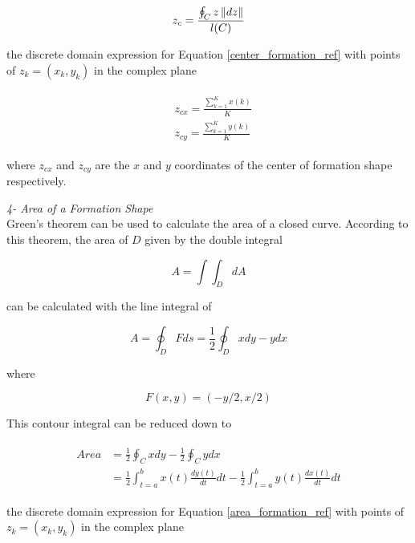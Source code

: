 \begin{equation} \label{center_formation_ref}
 z_c = \frac{\oint_C z\left\lVert dz\right\rVert}{l(C)}
\end{equation}
		
the discrete domain expression for Equation \ref{center_formation_ref} with points of  $z_k = (x_k,y_k)$ in the complex plane

\begin{align}
\begin{split}
&z_{cx} = \frac{\sum_{k=1}^{K}x(k)}{K}  \\
&z_{cy} = \frac{\sum_{k=1}^{K}y(k)}{K}  
\end{split}
\end{align}
		
where $z_{cx}$ and $z_{cy}$ are the $x$ and $y$ coordinates of the center of formation shape respectively.

\textit{ 	4- Area of a Formation Shape} \\ 		
Green's theorem can be used to calculate the area of a closed curve. According to this theorem, the area of $D$ given by the double integral

\begin{equation}
 A = \int\int_D dA
\end{equation}
		
can be calculated with the line integral of

\begin{equation}
 A = \oint_D F ds = \frac{1}{2} \oint_D xdy - ydx
\end{equation}

where

\begin{equation}
F(x,y) = (-y/2,x/2)
\end{equation}
		
This contour integral can be reduced down to

\begin{align} \label{area_formation_ref}
\begin{split}
Area &= \frac{1}{2} \oint_C xdy - \frac{1}{2} \oint_C ydx \\
&= \frac{1}{2} \int_{t=a}^{b} x(t)\frac{dy(t)}{dt}dt - \frac{1}{2} \int_{t=a}^{b}y(t)\frac{dx(t)}{dt}dt
\end{split}
\end{align}
		
the discrete domain expression for Equation \ref{area_formation_ref} with points of  $z_k = (x_k,y_k)$ in the complex plane
			
